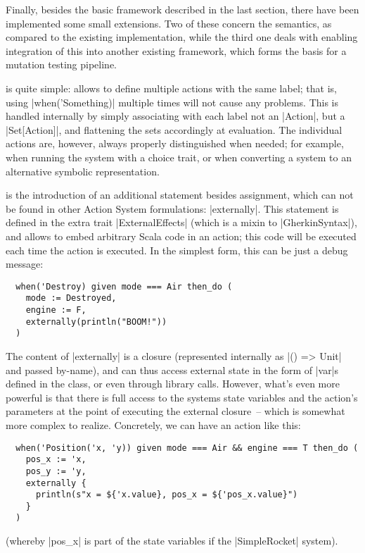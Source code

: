 Finally, besides the basic \dsl{} framework described in the last section, there have been
implemented some small extensions. Two of these concern the semantics, as compared to the existing
implementation, while the third one deals with enabling integration of this \dsl{} into another
existing framework, which forms the basis for a mutation testing pipeline.

 is quite simple: \actium{} allows to define multiple actions
with the same label; that is, using |when('Something)| multiple times will not cause any
problems. This is handled internally by simply associating with each label not an |Action|, but a
|Set[Action]|, and flattening the sets accordingly at evaluation. The individual actions are,
however, always properly distinguished when needed; for example, when running the system with a
choice trait, or when converting a system to an alternative symbolic representation.

 is the introduction of an additional statement besides
assignment, which can not be found in other Action System formulations: |externally|. This statement
is defined in the extra trait |ExternalEffects| (which is a mixin to |GherkinSyntax|), and allows to
embed arbitrary Scala code in an action; this code will be executed each time the action is
executed. In the simplest form, this can be just a debug message:
\begin{lstlisting}
  when('Destroy) given mode === Air then_do (
    mode := Destroyed,
    engine := F,
    externally(println("BOOM!"))
  )
\end{lstlisting}
The content of |externally| is a closure (represented internally as |() => Unit| and passed
by-name), and can thus access external state in the form of |var|s defined in the class, or even
through library calls. However, what's even more powerful is that there is full access to the
systems state variables and the action's parameters at the point of executing the external
closure~-- which is somewhat more complex to realize. Concretely, we can have an action like this:
\begin{lstlisting}
  when('Position('x, 'y)) given mode === Air && engine === T then_do (
    pos_x := 'x,
    pos_y := 'y,
    externally {
      println(s"x = ${'x.value}, pos_x = ${'pos_x.value}")
    }
  )
\end{lstlisting}%
(whereby |pos_x| is part of the state variables if the |SimpleRocket| system). 

